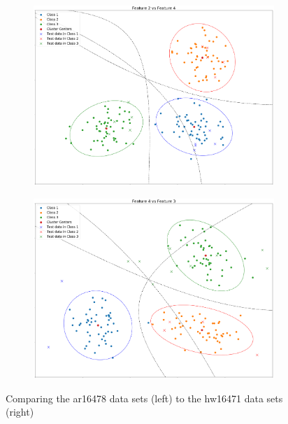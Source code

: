 \documentclass[a4paper]{article}
\begin{document}
\begin{figure}
\begin{subfigure}[h]{0.5\columnwidth}
\includegraphics[width=\columnwidth]{plot4.png}
\end{subfigure}
\hfill
\begin{subfigure}[h]{0.5\columnwidth}
\includegraphics[width=\columnwidth]{plot6.png}
\end{subfigure}%
\caption{Comparing the ar16478 data sets (left) to the hw16471 data sets (right)}
\end{figure}



\end{document}
